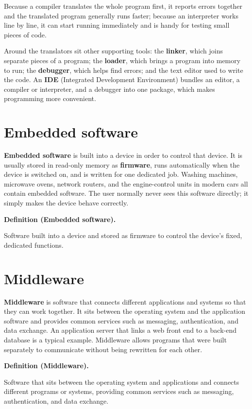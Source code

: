 \documentclass[11pt]{article}
\newenvironment{definitionbox}[1]{%
  \par\noindent\textbf{Definition (#1).}\ \itshape
}{\par\vspace{0.3em}}
\begin{document}
Because a compiler translates the whole program first, it reports errors
together and the translated program generally runs faster; because an
interpreter works line by line, it can start running immediately and is
handy for testing small pieces of code.

Around the translators sit other supporting tools: the \textbf{linker}, which
joins separate pieces of a program; the \textbf{loader}, which brings a program
into memory to run; the \textbf{debugger}, which helps find errors; and the
text editor used to write the code. An \textbf{IDE} (Integrated Development
Environment) bundles an editor, a compiler or interpreter, and a debugger into
one package, which makes programming more convenient.

\section{Embedded software}
\textbf{Embedded software} is built into a device in order to control that
device. It is usually stored in read-only memory as \textbf{firmware}, runs
automatically when the device is switched on, and is written for one dedicated
job. Washing machines, microwave ovens, network routers, and the
engine-control units in modern cars all contain embedded software. The user
normally never sees this software directly; it simply makes the device behave
correctly.

\begin{definitionbox}{Embedded software}
Software built into a device and stored as firmware to control the device's
fixed, dedicated functions.
\end{definitionbox}

\section{Middleware}
\textbf{Middleware} is software that connects different applications and
systems so that they can work together. It sits between the operating system
and the application software and provides common services such as messaging,
authentication, and data exchange. An application server that links a web
front end to a back-end database is a typical example. Middleware allows
programs that were built separately to communicate without being rewritten
for each other.

\begin{definitionbox}{Middleware}
Software that sits between the operating system and applications and connects
different programs or systems, providing common services such as messaging,
authentication, and data exchange.
\end{definitionbox}
\end{document}
